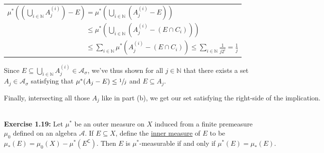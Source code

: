 \documentclass{book}
\newenvironment{myIndent}{%
   \begin{adjustwidth}{2.5em}{0em}%
}{%
   \end{adjustwidth}%
}
\newcommand{\udefine}[1]{{%
   \setulcolor{Red}%
   \setul{0.14em}{0.07em}%
   \ul{#1}%
}}
\newcommand{\blab}[1]{\textbf{#1}}
\newcommand{\comp}{\mathsf{C}}
\newcommand{\mySepTwo}[1][.]{%
   {\noindent\color{#1}{\rule{6.5in}{0.5mm}}}\\%
}
\newcommand{\retTwo}{\hfill\bigbreak}
\begin{document}
\begin{enumerate}
\begin{myIndent}
      {\centering
      \begin{tabular}{l}
         $\mu^*((\bigcup\limits_{i\in\mathbb{N}}A_j^{(i)}) - E) = \mu^*(\bigcup\limits_{i\in\mathbb{N}}(A_j^{(i)} - E))$\\ [6pt]
         
         $\phantom{\mu^*((\bigcup\limits_{i\in\mathbb{N}}A_j^{(i)}) - E) } \leq \mu^*(\bigcup\limits_{i\in\mathbb{N}}(A_j^{(i)} - (E \cap C_i)))$\\
         
         $\phantom{\mu^*((\bigcup\limits_{i\in\mathbb{N}}A_j^{(i)}) - E) } \leq \sum\limits_{i \in \mathbb{N}}\mu^*(A_j^{(i)} - (E \cap C_i)) \leq \sum\limits_{i \in \mathbb{N}}\frac{1}{j2^i} = \frac{1}{j}$
      \end{tabular} \retTwo\par}

      Since $E \subseteq \bigcup\limits_{i \in \mathbb{N}}A_j^{(i)} \in \mathcal{A}_\sigma$, we've thus shown for all $j \in \mathbb{N}$ that there exists a set\\ [-8pt]\phantom{Aaaaaaaaaaaaaaaaaa} $A_j \in \mathcal{A}_\sigma$ satisfying that $\mu^*(A_j - E) \leq \sfrac{1}{j}$ and $E \subseteq A_j$.\retTwo

      Finally, intersecting all those $A_j$ like in part (b), we get our set satisfying the right-side of the implication.\retTwo
   \end{myIndent}
\end{enumerate}

\mySepTwo

\blab{Exercise 1.19:} Let $\mu^*$ be an outer measure on $X$ induced from a finite premeasure\\ $\mu_0$ defined on an algebra $\mathcal{A}$. If $E \subseteq X$, define the \udefine{inner measure} of $E$ to be\\ $\mu_*(E) = \mu_0(X) - \mu^*(E^\comp)$. Then $E$ is $\mu^*$-measurable if and only if $\mu^*(E) = \mu_*(E)$.\\ [-9pt]
\end{document}
